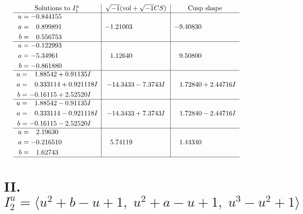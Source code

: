 \documentclass[1p]{elsarticle_modified}
\theoremstyle{definition}
\newcommand{\I}{\sqrt{-1}}
\begin{document}
$$\begin{array}{c|c|c}  
\text{Solutions to }I^u_{1}& \I (\text{vol} + \sqrt{-1}CS) & \text{Cusp shape}\\
 \hline 
\begin{aligned}
u &= -0.844155\phantom{ +0.000000I} \\
a &= \phantom{-}0.899891\phantom{ +0.000000I} \\
b &= \phantom{-}0.556753\phantom{ +0.000000I}\end{aligned}
 & -1.21003\phantom{ +0.000000I} & -9.40830\phantom{ +0.000000I} \\ \hline\begin{aligned}
u &= -0.122993\phantom{ +0.000000I} \\
a &= -5.34961\phantom{ +0.000000I} \\
b &= -0.861880\phantom{ +0.000000I}\end{aligned}
 & \phantom{-}1.12640\phantom{ +0.000000I} & \phantom{-}9.50800\phantom{ +0.000000I} \\ \hline\begin{aligned}
u &= \phantom{-}1.88542 + 0.91135 I \\
a &= \phantom{-}0.333114 + 0.921118 I \\
b &= -0.16115 + 2.52520 I\end{aligned}
 & -14.3433 - 7.3743 I & \phantom{-}1.72840 + 2.44716 I \\ \hline\begin{aligned}
u &= \phantom{-}1.88542 - 0.91135 I \\
a &= \phantom{-}0.333114 - 0.921118 I \\
b &= -0.16115 - 2.52520 I\end{aligned}
 & -14.3433 + 7.3743 I & \phantom{-}1.72840 - 2.44716 I \\ \hline\begin{aligned}
u &= \phantom{-}2.19630\phantom{ +0.000000I} \\
a &= -0.216510\phantom{ +0.000000I} \\
b &= \phantom{-}1.62743\phantom{ +0.000000I}\end{aligned}
 & \phantom{-}5.74119\phantom{ +0.000000I} & \phantom{-}1.44340\phantom{ +0.000000I}\\
 \hline 
 \end{array}$$\newpage\newpage\renewcommand{\arraystretch}{1}
\centering \section*{II. $I^u_{2}= \langle u^2+b- u+1,\;u^2+a- u+1,\;u^3- u^2+1 \rangle$}
\end{document}
